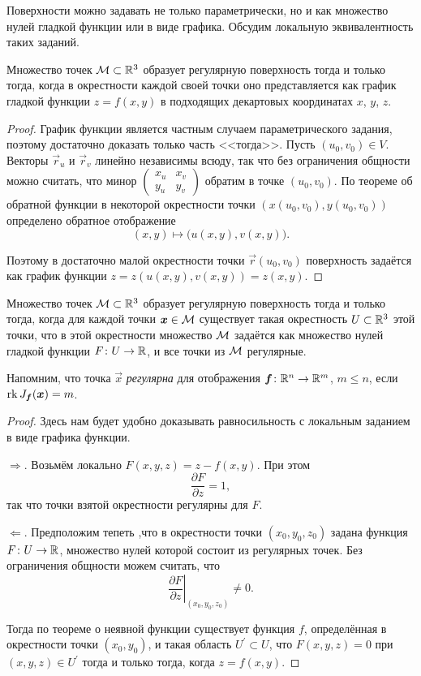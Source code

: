 Поверхности можно задавать не только параметрически, но и как множество нулей гладкой функции или в виде графика. Обсудим локальную эквивалентность таких заданий.

\begin{proposition} \label{proposition:SurfaceGraph}
	Множество точек $\mathcal{M} \subset \mathbb{R}^3$ образует регулярную поверхность тогда и только тогда, когда в окрестности каждой своей точки оно представляется как график гладкой функции $z = f(x, y)$ в подходящих декартовых координатах $x$, $y$, $z$.
\end{proposition}

\begin{proof}
	График функции является частным случаем параметрического задания, поэтому достаточно доказать только часть <<тогда>>. Пусть $(u_0, v_0) \in V$. Векторы $\vec{r}_u$ и $\vec{r}_v$ линейно независимы всюду, так что без ограничения общности можно считать, что минор
	$
		\begin{pmatrix}
			x_u & x_v\\
			y_u & y_v
		\end{pmatrix}
	$
	обратим в точке $(u_0, v_0)$. По теореме об обратной функции в некоторой окрестности точки $(x(u_0, v_0), y(u_0, v_0))$ определено обратное отображение
	\[
		(x, y) \mapsto \big(u(x, y), v(x, y)\big).
	\]

	Поэтому в достаточно малой окрестности точки $\vec{r}(u_0, v_0)$ поверхность задаётся как график функции $z = z(u(x, y), v(x, y)) = z(x, y)$.
\end{proof}

\begin{proposition}
	Множество точек $\mathcal{M} \subset \mathbb{R}^3$ образует регулярную поверхность тогда и только тогда, когда для каждой точки $\boldsymbol{x} \in \mathcal{M}$ существует такая окрестность $U \subset \mathbb{R}^3$ этой точки, что в этой окрестности множество $\mathcal{M}$ задаётся как множество нулей гладкой функции $F\colon U \to \mathbb{R}$, и все точки из $\mathcal{M}$ регулярные.
\end{proposition}

\noindent
Напомним, что точка $\vec{x}$ \textit{регулярна} для отображения $\boldsymbol{f}\colon \mathbb{R}^n \to \mathbb{R}^m$, $m \leqslant n$, если $\operatorname{rk} J_{\boldsymbol{f}}(\boldsymbol{x}) = m$.

\begin{proof}
	Здесь нам будет удобно доказывать равносильность с локальным заданием в виде графика функции.

	$\Rightarrow$. Возьмём локально $F(x, y, z) = z - f(x, y)$. При этом
	\[
		\frac{\partial F}{\partial z} = 1,
	\]
	так что точки взятой окрестности регулярны для $F$.

	$\Leftarrow$. Предположим тепеть ,что в окрестности точки $(x_0, y_0, z_0)$ задана функция $F\colon U \to \mathbb{R}$, множество нулей которой состоит из регулярных точек. Без ограничения общности можем считать, что
	\[
		\left.\frac{\partial F}{\partial z}\right|_{(x_0, y_0, z_0)} \ne 0.
	\]

	Тогда по теореме о неявной функции существует функция $f$, определённая в окрестности точки $(x_0, y_0)$, и такая область $U^\prime \subset U$, что $F(x, y, z) = 0$ при $(x, y, z) \in U^\prime$ тогда и только тогда, когда $z = f(x, y)$.
\end{proof}

